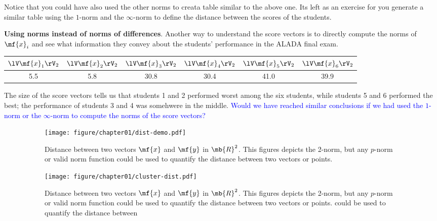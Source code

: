 \begin{boxedstuff}
\begin{example}
        \noindent Notice that you could have also used the other norms to creata  table similar to the above one. Its left as an exercise for you generate a similar table using the $1$-norm and the $\infty$-norm to define the distance between the scores of the students.

        \textbf{Using norms instead of norms of differences}. Another way to understand the score vectors is to directly compute the norms of $\mf{x}_i$ and see what information they convey about the students' performance in the ALADA final exam.
        \begin{small}
            \begin{center}
                    \begin{tabular}{|c|c|c|c|c|c|}
                    \hline
                    $\lV \mf{x}_1 \rV_2$ & $\lV \mf{x}_2 \rV_2$ & $\lV \mf{x}_3 \rV_2$ & $\lV \mf{x}_4 \rV_2$ & $\lV \mf{x}_5 \rV_2$ & $\lV \mf{x}_6 \rV_2$ \\ \hline
                    5.5 & 5.8 & 30.8 & 30.4 & 41.0 & 39.9 \\ \hline
                    \end{tabular}
            \end{center}
        \end{small}
        The size of the score vectors tells us that students 1 and 2 performed worst among the six students, while students 5 and 6 performed the best; the performance of students 3 and 4 was somehwere in the middle. \textcolor{blue}{Would we have reached similar conclusions if we had used the $1$-norm or the $\infty$-norm to compute the norms of the score vectors?}
        \label{example:alada-scores}
    \end{example}
\end{boxedstuff}

\begin{figure}[h]
    \centering
    \begin{subfigure}[b]{0.35\textwidth}
        \texttt{[image: figure/chapter01/dist-demo.pdf]}
        \caption{Distance between two vectors $\mf{x}$ and $\mf{y}$ in $\mb{R}^2$. This figures depicts the 2-norm, but any $p$-norm or valid norm function could be used to quantify the distance between two vectors or points.}
        \label{fig:ch01-dist1}
    \end{subfigure}
    \hspace{0.05\textwidth}
    \begin{subfigure}[b]{0.4\textwidth}
        \centering
        \texttt{[image: figure/chapter01/cluster-dist.pdf]}
        \caption{Distance between two vectors $\mf{x}$ and $\mf{y}$ in $\mb{R}^2$. This figures depicts the 2-norm, but any $p$-norm or valid norm function could be used to quantify the distance between two vectors or points.  could be used to quantify the distance between}
        \label{fig:ch01-dist-clusters}
    \end{subfigure}
    \caption{}
\end{figure}

